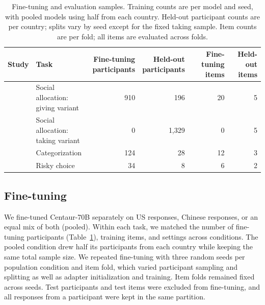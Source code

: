 \begin{table}[t]
\centering
\small
\setlength{\tabcolsep}{5pt}
\begin{tabular}{llrrrr}
\toprule
Study & Task &
\shortstack{Fine-tuning\\participants} &
\shortstack{Held-out\\participants} &
\shortstack{Fine-tuning\\items} &
\shortstack{Held-out\\items} \\
\midrule
\citet{wang2026decomposing} & \shortstack[l]{Social allocation:\\giving variant} & 910 & 196 & 20 & 5  \\
\citet{wang2026decomposing} & \shortstack[l]{Social allocation:\\taking variant} &   0 & 1,329 & 0 & 5 \\
\citet{cao2024differences} & Categorization & 124 & 28 & 12 & 3  \\
\citet{anllo2024preferences} & Risky choice & 34 & 8 & 6 & 2  \\
\bottomrule
\end{tabular}
\caption{Fine-tuning and evaluation samples. Training counts are per model and seed, with pooled models using half from each country. Held-out participant counts are per country; splits vary by seed except for the fixed taking sample. Item counts are per fold; all items are evaluated across folds.}
\label{tab:design}
\end{table}




\subsection{Fine-tuning}

We fine-tuned Centaur-70B separately on US responses, Chinese responses, or an equal mix of both (pooled). Within each task, we matched the number of fine-tuning participants (Table~\ref{tab:design}), training items, and settings across conditions. The pooled condition drew half its participants from each country while keeping the same total sample size. We repeated fine-tuning with three random seeds per population condition and item fold, which varied participant sampling and splitting as well as adapter initialization and training. Item folds remained fixed across seeds. Test participants and test items were excluded from fine-tuning, and all responses from a participant were kept in the same partition.


